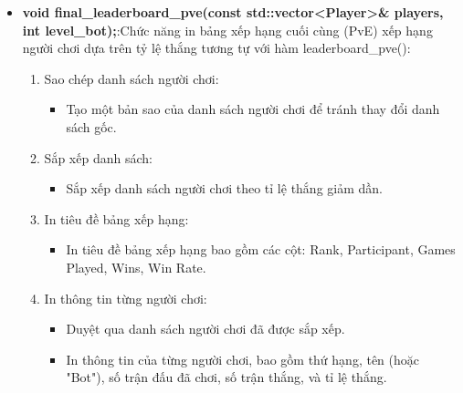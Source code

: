 \documentclass{article}
\begin{document}
\begin{itemize}
    \item \textbf{void final\_leaderboard\_pve(const std::vector<Player>\& players, int level\_bot);}:Chức năng in bảng xếp hạng cuối cùng (PvE) xếp hạng người chơi dựa trên tỷ lệ thắng tương tự với hàm leaderboard\_pve():
    \begin{description}
            \begin{enumerate}
            \item Sao chép danh sách người chơi:
                \begin{itemize}
                    \item Tạo một bản sao của danh sách người chơi để tránh thay đổi danh sách gốc.
                \end{itemize}
            \item Sắp xếp danh sách:
                \begin{itemize}
                    \item Sắp xếp danh sách người chơi theo tỉ lệ thắng giảm dần.
                \end{itemize}
            \item In tiêu đề bảng xếp hạng:
                \begin{itemize}
                    \item In tiêu đề bảng xếp hạng bao gồm các cột: Rank, Participant, Games Played, Wins, Win Rate.
                \end{itemize}
            \item In thông tin từng người chơi:
                \begin{itemize}
                    \item Duyệt qua danh sách người chơi đã được sắp xếp.
                    \item In thông tin của từng người chơi, bao gồm thứ hạng, tên (hoặc "Bot"), số trận đấu đã chơi, số trận thắng, và tỉ lệ thắng.
                \end{itemize}
        \end{enumerate}
    \end{description}
    

\end{itemize}
\end{document}
